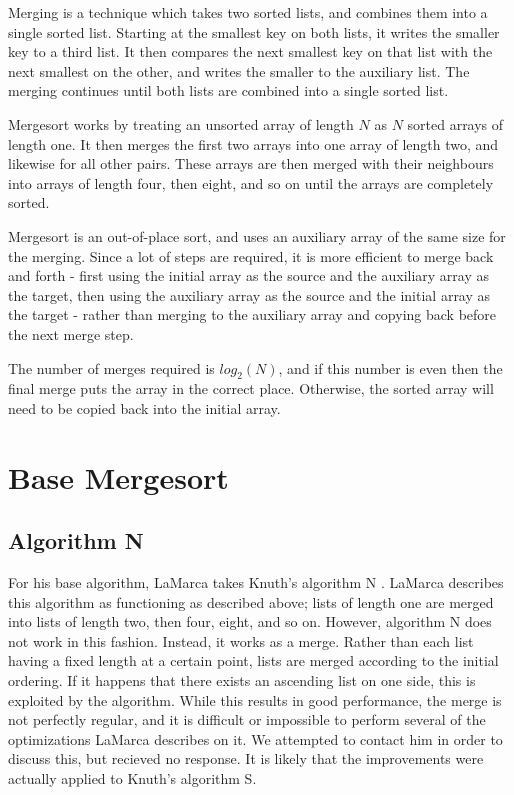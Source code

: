 \label{merge}
Merging is a technique which takes two sorted lists, and combines them into a
single sorted list. Starting at the smallest key on both lists, it writes the
smaller key to a third list. It then compares the next smallest key on that list
with the next smallest on the other, and writes the smaller to the auxiliary
list. The merging continues until both lists are combined into a single sorted
list.

Mergesort works by treating an unsorted array of length $N$ as $N$ sorted arrays of
length one. It then merges the first two arrays into one array of length two, and
likewise for all other pairs. These arrays are then merged with their neighbours
into arrays of length four, then eight, and so on until the arrays are
completely sorted.

Mergesort is an out-of-place sort, and uses an auxiliary array of the same size
for the merging. Since a lot of steps are required, it is more efficient to
merge back and forth - first using the initial array as the source and the
auxiliary array as the target, then using the auxiliary array as the source and
the initial array as the target - rather than merging to the auxiliary array and
copying back before the next merge step.

The number of merges required is $log_2(N)$, and if this number is even then the
final merge puts the array in the correct place. Otherwise, the sorted array
will need to be copied back into the initial array.

\section{Base Mergesort}

\subsection{Algorithm N}
\label{Algorithm N}

For his base algorithm, LaMarca takes Knuth's algorithm N \cite{Knuth98}.
LaMarca describes this algorithm as functioning as described above; lists of
length one are merged into lists of length two, then four, eight, and so on.
However, algorithm N does not work in this fashion. Instead, it works as a
 merge. Rather than each list having a fixed length at a certain
point, lists are merged according to the initial ordering. If it happens that
there exists an ascending list on one side, this is exploited by the algorithm.
While this results in good performance, the merge is not perfectly regular, and
it is difficult or impossible to perform several of the optimizations LaMarca
describes on it. We attempted to contact him in order to discuss this, but
recieved no response. It is likely that the improvements were actually applied
to Knuth's algorithm S.

